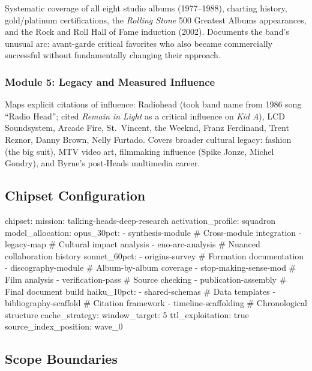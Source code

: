 \documentclass[11pt,letterpaper]{article}
\begin{document}
Systematic coverage of all eight studio albums (1977--1988), charting history, gold/platinum certifications, the \textit{Rolling Stone} 500 Greatest Albums appearances, and the Rock and Roll Hall of Fame induction (2002). Documents the band's unusual arc: avant-garde critical favorites who also became commercially successful without fundamentally changing their approach.

\subsubsection{Module 5: Legacy and Measured Influence}

Maps explicit citations of influence: Radiohead (took band name from 1986 song ``Radio Head''; cited \textit{Remain in Light} as a critical influence on \textit{Kid A}), LCD Soundsystem, Arcade Fire, St.\ Vincent, the Weeknd, Franz Ferdinand, Trent Reznor, Danny Brown, Nelly Furtado. Covers broader cultural legacy: fashion (the big suit), MTV video art, filmmaking influence (Spike Jonze, Michel Gondry), and Byrne's post-Heads multimedia career.

\subsection{Chipset Configuration}

\begin{asciibox}
  chipset:
    mission: talking-heads-deep-research
    activation_profile: squadron
    model_allocation:
      opus_30pct:
        - synthesis-module        # Cross-module integration
        - legacy-map              # Cultural impact analysis
        - eno-arc-analysis        # Nuanced collaboration history
      sonnet_60pct:
        - origins-survey          # Formation documentation
        - discography-module      # Album-by-album coverage
        - stop-making-sense-mod   # Film analysis
        - verification-pass       # Source checking
        - publication-assembly    # Final document build
      haiku_10pct:
        - shared-schemas          # Data templates
        - bibliography-scaffold   # Citation framework
        - timeline-scaffolding    # Chronological structure
    cache_strategy:
      window_target: 5
      ttl_exploitation: true
      source_index_position: wave_0
\end{asciibox}

\subsection{Scope Boundaries}
\end{document}
